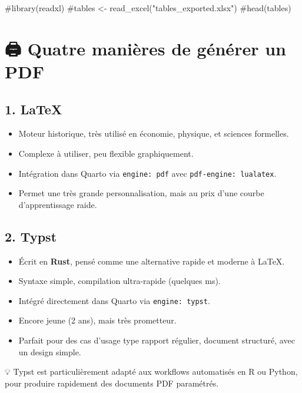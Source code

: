 \documentclass[
  letterpaper,
  DIV=11,
  numbers=noendperiod]{scrartcl}
\newenvironment{Shaded}{\begin{snugshade}}{\end{snugshade}}
\newcommand{\CommentTok}[1]{\textcolor[rgb]{0.37,0.37,0.37}{#1}}
\providecommand{\tightlist}{%
  \setlength{\itemsep}{0pt}\setlength{\parskip}{0pt}}\usepackage{longtable,booktabs,array}
\begin{document}
\begin{Shaded}
\begin{Highlighting}[]
\CommentTok{\#library(readxl)}
\CommentTok{\#tables \textless{}{-} read\_excel("tables\_exported.xlsx")}
\CommentTok{\#head(tables)}
\end{Highlighting}
\end{Shaded}

\section{🖨️ Quatre manières de générer un
PDF}\label{quatre-maniuxe8res-de-guxe9nuxe9rer-un-pdf}

\subsection{1. LaTeX}\label{latex}

\begin{itemize}
\tightlist
\item
  Moteur historique, très utilisé en économie, physique, et sciences
  formelles.
\item
  Complexe à utiliser, peu flexible graphiquement.
\item
  Intégration dans Quarto via \texttt{engine:\ pdf} avec
  \texttt{pdf-engine:\ lualatex}.
\item
  Permet une très grande personnalisation, mais au prix d'une courbe
  d'apprentissage raide.
\end{itemize}

\subsection{2. Typst}\label{typst}

\begin{itemize}
\tightlist
\item
  Écrit en \textbf{Rust}, pensé comme une alternative rapide et moderne
  à LaTeX.
\item
  Syntaxe simple, compilation ultra-rapide (quelques ms).
\item
  Intégré directement dans Quarto via \texttt{engine:\ typst}.
\item
  Encore jeune (2 ans), mais très prometteur.
\item
  Parfait pour des cas d'usage type rapport régulier, document
  structuré, avec un design simple.
\end{itemize}

💡 Typst est particulièrement adapté aux workflows automatisés en R ou
Python, pour produire rapidement des documents PDF paramétrés.
\end{document}
